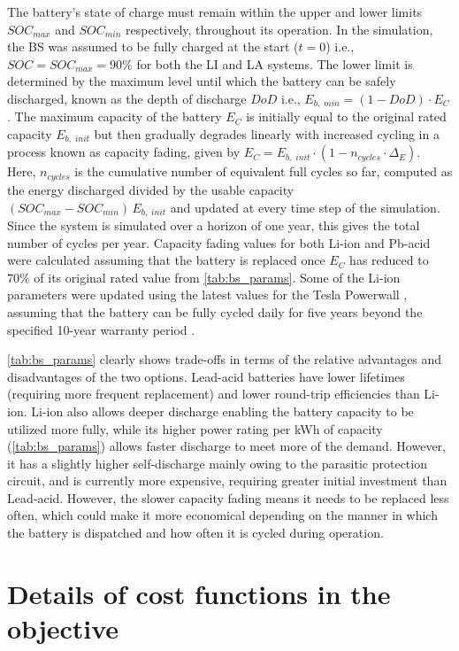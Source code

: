 \documentclass[final,3p,times]{elsarticle}
\begin{document}
The battery's state of charge must remain within the upper and lower limits $SOC_{max}$ and $SOC_{min}$ respectively, throughout its operation. In the simulation, the BS was assumed to be fully charged at the start ($t = 0$) i.e., $SOC = SOC_{max} = 90\%$ for both the LI and LA systems. The lower limit is determined by the maximum level until which the battery can be safely discharged, known as the depth of discharge $DoD$ i.e., $E_{b,\;min} = (1 - DoD)\cdot E_C$. The maximum capacity of the battery $E_C$ is initially equal to the original rated capacity $E_{b,\; init}$ but then gradually degrades linearly with increased cycling in a process known as capacity fading, given by $E_C = E_{b,\; init} \cdot (1 - n_{cycles}\cdot \Delta_E)$. Here, $n_{cycles}$ is the cumulative number of equivalent full cycles so far, computed as the energy discharged divided by the usable capacity $(SOC_{max}-SOC_{min})\,E_{b,\;init}$ and updated at every time step of the simulation. Since the system is simulated over a horizon of one year, this gives the total number of cycles per year. Capacity fading values for both Li-ion and Pb-acid were calculated assuming that the battery is replaced once $E_C$ has reduced to 70\% of its original rated value from \cref{tab:bs_params}. %
Some of the Li-ion parameters were updated using the latest values for the Tesla Powerwall \cite{powerwall}, assuming that the battery can be fully cycled daily for five years beyond the specified 10-year warranty period \cite{bs_source}.

\cref{tab:bs_params} clearly shows trade-offs in terms of the relative advantages and disadvantages of the two options. Lead-acid batteries have lower lifetimes (requiring more frequent replacement) and lower round-trip efficiencies than Li-ion. Li-ion also allows deeper discharge enabling the battery capacity to be utilized more fully, while its higher power rating per kWh of capacity (\cref{tab:bs_params}) allows faster discharge to meet more of the demand. However, it has a slightly higher self-discharge mainly owing to the parasitic protection circuit, and is currently more expensive, requiring greater initial investment than Lead-acid. However, the slower capacity fading means it needs to be replaced less often, which could make it more economical depending on the manner in which the battery is dispatched and how often it is cycled during operation. 

\section{Details of cost functions in the objective \label{app:costs}}
\end{document}
